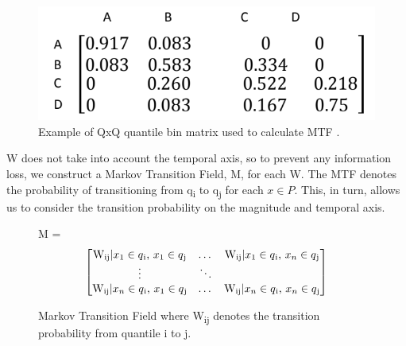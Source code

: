 \documentclass{turabian-thesis}
\begin{document}
\begin{figure}[h!]
   \begin{center}
      \includegraphics[scale=0.6]{../media/mtf_q.png}
   \end{center}
   \caption{Example of QxQ quantile bin matrix used to calculate MTF \cite{wang_encoding_nodate}.}
   \label{fig:mtf_q}
\end{figure}
 


W does not take into account the temporal axis, so to prevent any information loss, we construct a Markov Transition Field, M, for each W. The MTF denotes the probability of transitioning from q\textsubscript{i} to q\textsubscript{j} for each $x \in P$. This, in turn, allows us to consider the transition probability on the magnitude and temporal axis.

\begin{figure}[h!]
  \centering
  M =
  \[\begin{bmatrix}

  \text{W\textsubscript{ij}} | \text{$x\textsubscript{1} \in q\textsubscript{i}$, $x_{1} \in q\textsubscript{j}$}
  & \dots &
  
  \text{W\textsubscript{ij}}  |  \text{$x_{1} \in q\textsubscript{i}$, $x_{n} \in q\textsubscript{j}$} 
  
  \\
  
  \vdots &  \ddots & \\
  
  \text{W\textsubscript{ij}} | \text{$x_{n} \in q\textsubscript{i}$, $x_{1} \in q\textsubscript{j}$}
  & \dots &
  \text{W\textsubscript{ij}} | \text{$x_{n} \in q\textsubscript{i}$, $x_{n} \in q\textsubscript{j}$} \\
  
  
  \end{bmatrix}\]
  \caption{Markov Transition Field where  W\textsubscript{ij} denotes the transition probability from quantile i to j.}
  \label{fig:mtf}
\end{figure}
\end{document}
